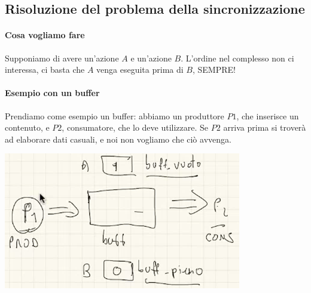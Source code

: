 \documentclass[11pt]{report}
\theoremstyle{definition}
\begin{document}
\subsection{Risoluzione del problema della sincronizzazione}
\paragraph{Cosa vogliamo fare} Supponiamo di avere un'azione $A$ e un'azione $B$. L'ordine nel complesso non ci interessa, ci basta che $A$ venga eseguita prima di $B$, SEMPRE!
\paragraph{Esempio con un buffer}
Prendiamo come esempio un buffer: abbiamo un produttore $P1$, che inserisce un contenuto, e $P2$, consumatore, che lo deve utilizzare.  Se $P2$ arriva prima si troverà ad elaborare dati casuali, e noi non vogliamo che ciò avvenga.\begin{center}\includegraphics[scale=.8]{img/192.PNG}\end{center}
\end{document}
